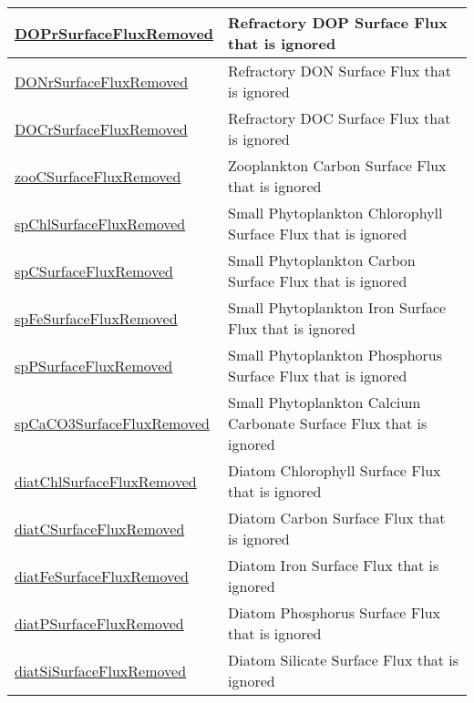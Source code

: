 {\begin{center}
\begin{longtable}{| p{2.0in} | p{4.0in} |}
    \hline
    \hyperref[subsec:var_sec_forcing_DOPrSurfaceFluxRemoved]{DOPrSurfaceFluxRemoved} & Refractory DOP Surface Flux that is ignored \\
    \hline
    \hyperref[subsec:var_sec_forcing_DONrSurfaceFluxRemoved]{DONrSurfaceFluxRemoved} & Refractory DON Surface Flux that is ignored \\
    \hline
    \hyperref[subsec:var_sec_forcing_DOCrSurfaceFluxRemoved]{DOCrSurfaceFluxRemoved} & Refractory DOC Surface Flux that is ignored \\
    \hline
    \hyperref[subsec:var_sec_forcing_zooCSurfaceFluxRemoved]{zooCSurfaceFluxRemoved} & Zooplankton Carbon Surface Flux that is ignored \\
    \hline
    \hyperref[subsec:var_sec_forcing_spChlSurfaceFluxRemoved]{spChlSurfaceFluxRemoved} & Small Phytoplankton Chlorophyll Surface Flux that is ignored \\
    \hline
    \hyperref[subsec:var_sec_forcing_spCSurfaceFluxRemoved]{spCSurfaceFluxRemoved} & Small Phytoplankton Carbon Surface Flux that is ignored \\
    \hline
    \hyperref[subsec:var_sec_forcing_spFeSurfaceFluxRemoved]{spFeSurfaceFluxRemoved} & Small Phytoplankton Iron Surface Flux that is ignored \\
    \hline
    \hyperref[subsec:var_sec_forcing_spPSurfaceFluxRemoved]{spPSurfaceFluxRemoved} & Small Phytoplankton Phosphorus Surface Flux that is ignored \\
    \hline
    \hyperref[subsec:var_sec_forcing_spCaCO3SurfaceFluxRemoved]{spCaCO3SurfaceFluxRemoved} & Small Phytoplankton Calcium Carbonate Surface Flux that is ignored \\
    \hline
    \hyperref[subsec:var_sec_forcing_diatChlSurfaceFluxRemoved]{diatChlSurfaceFluxRemoved} & Diatom Chlorophyll Surface Flux that is ignored \\
    \hline
    \hyperref[subsec:var_sec_forcing_diatCSurfaceFluxRemoved]{diatCSurfaceFluxRemoved} & Diatom Carbon Surface Flux that is ignored \\
    \hline
    \hyperref[subsec:var_sec_forcing_diatFeSurfaceFluxRemoved]{diatFeSurfaceFluxRemoved} & Diatom Iron Surface Flux that is ignored \\
    \hline
    \hyperref[subsec:var_sec_forcing_diatPSurfaceFluxRemoved]{diatPSurfaceFluxRemoved} & Diatom Phosphorus Surface Flux that is ignored \\
    \hline
    \hyperref[subsec:var_sec_forcing_diatSiSurfaceFluxRemoved]{diatSiSurfaceFluxRemoved} & Diatom Silicate Surface Flux that is ignored \\

\end{longtable}
\end{center}}
